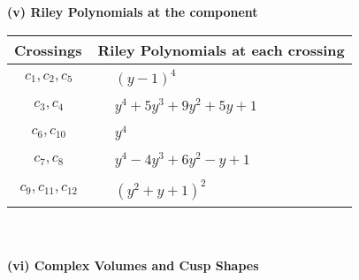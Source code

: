 \documentclass[1p]{elsarticle_modified}
\theoremstyle{definition}
\begin{document}
\newpage\renewcommand{\arraystretch}{1}
\flushleft \textbf{(v) Riley Polynomials at the component}\newline \\
\begin{tabular}{m{50pt}|m{274pt}}
Crossings & \hspace{64pt}Riley Polynomials at each crossing \\
\hline $$\begin{aligned}c_{1},c_{2},c_{5}\end{aligned}$$&$\begin{aligned}
&(y-1)^4
\end{aligned}$\\
\hline $$\begin{aligned}c_{3},c_{4}\end{aligned}$$&$\begin{aligned}
&y^4+5 y^3+9 y^2+5 y+1
\end{aligned}$\\
\hline $$\begin{aligned}c_{6},c_{10}\end{aligned}$$&$\begin{aligned}
&y^4
\end{aligned}$\\
\hline $$\begin{aligned}c_{7},c_{8}\end{aligned}$$&$\begin{aligned}
&y^4-4 y^3+6 y^2- y+1
\end{aligned}$\\
\hline $$\begin{aligned}c_{9},c_{11},c_{12}\end{aligned}$$&$\begin{aligned}
&(y^2+y+1)^2
\end{aligned}$\\
\hline
\end{tabular}\\~\\
\newpage\flushleft \textbf{(vi) Complex Volumes and Cusp Shapes}
\end{document}
